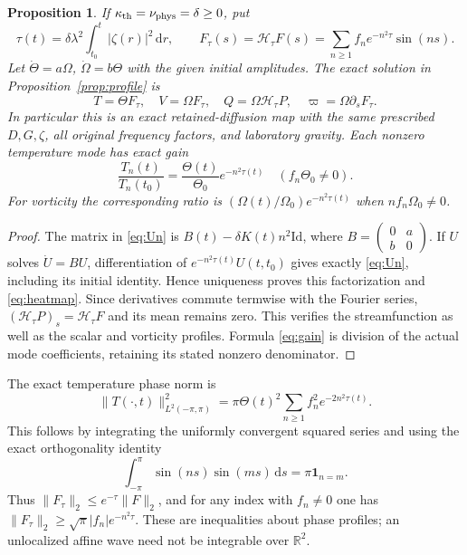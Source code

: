 \documentclass[11pt]{article}
\newtheorem{proposition}{Proposition}
\newcommand{\R}{\mathbb R}
\newcommand{\dd}{\mathrm d}
\newcommand{\thd}{\kappa_{\rm th}}
\newcommand{\vis}{\nu_{\rm phys}}
\newcommand{\Hs}{\mathcal H}
\begin{document}
\begin{proposition}\label{prop:heat}
If $\thd=\vis=\delta\geq0$, put
\begin{equation}\label{eq:heattime}
 \tau(t)=\delta\lambda^2\int_{t_0}^t|\zeta(r)|^2\,\dd r,
 \qquad
 F_{\tau}(s)=\Hs_{\tau}F(s)=\sum_{n\geq1}f_ne^{-n^2\tau}\sin(ns).
\end{equation}
Let $\dot\Theta=a\Omega$, $\dot\Omega=b\Theta$ with the given initial
amplitudes. The exact solution in Proposition~\ref{prop:profile} is
\begin{equation}\label{eq:heatmap}
 T=\Theta F_\tau,\quad V=\Omega F_\tau,\quad
 Q=\Omega\Hs_\tau P,
 \quad \varpi=\Omega\partial_sF_\tau.
\end{equation}
In particular this is an exact retained-diffusion map with the same
prescribed $D,G,\zeta$, all original frequency factors, and laboratory
gravity. Each nonzero temperature mode has exact gain
\begin{equation}\label{eq:gain}
 \frac{T_n(t)}{T_n(t_0)}
   =\frac{\Theta(t)}{\Theta_0}e^{-n^2\tau(t)}
 \quad(f_n\Theta_0\ne0).
\end{equation}
For vorticity the corresponding ratio is
$(\Omega(t)/\Omega_0)e^{-n^2\tau(t)}$ when $nf_n\Omega_0\ne0$.
\end{proposition}
\begin{proof}
The matrix in \eqref{eq:Un} is $B(t)-\delta K(t)n^2\mathrm{Id}$,
where $B=\left(\begin{smallmatrix}0&a\\b&0\end{smallmatrix}\right)$.
If $U$ solves $\dot U=BU$, differentiation of
$e^{-n^2\tau(t)}U(t,t_0)$ gives exactly \eqref{eq:Un}, including its
initial identity. Hence uniqueness proves this factorization and
\eqref{eq:heatmap}. Since derivatives commute termwise with the Fourier
series, $(\Hs_\tau P)_s=\Hs_\tau F$ and its mean remains zero.
This verifies the streamfunction as well as the scalar and vorticity
profiles. Formula \eqref{eq:gain} is division of the actual mode
coefficients, retaining its stated nonzero denominator.
\end{proof}

The exact temperature phase norm is
\begin{equation}\label{eq:norm}
 \|T(\cdot,t)\|_{L^2(-\pi,\pi)}^2
 =\pi\Theta(t)^2\sum_{n\geq1}f_n^2e^{-2n^2\tau(t)}.
\end{equation}
This follows by integrating the uniformly convergent squared series and
using the exact orthogonality identity
\[
 \int_{-\pi}^{\pi}\sin(ns)\sin(ms)\,\dd s=\pi\mathbf1_{n=m}.
\]
Thus $\|F_\tau\|_2\leq e^{-\tau}\|F\|_2$, and for any index with
$f_n\ne0$ one has $\|F_\tau\|_2\geq\sqrt\pi|f_n|e^{-n^2\tau}$.
These are inequalities about phase profiles; an unlocalized affine wave
need not be integrable over $\R^2$.
\end{document}
